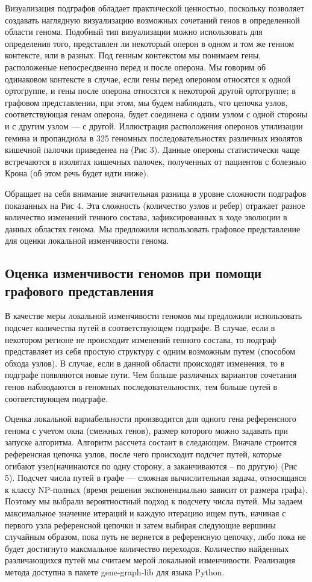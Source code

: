 Визуализация подграфов обладает практической ценностью, поскольку позволяет создавать наглядную визуализацию возможных сочетаний генов в определенной области генома. Подобный тип визуализации можно использовать для определения того, представлен ли некоторый оперон в одном и том же генном контексте, или в разных. Под генным контекстом мы понимаем гены, расположеные непосресдвенно перед и после оперона. Мы говорим об одинаковом контексте в случае, если гены перед опероном относятся к одной ортогруппе, и гены после оперона относятся к некоторой другой ортогруппе; в графовом представлении, при этом, мы будем наблюдать, что цепочка узлов, соответствующая генам оперона, будет соединена с одним узлом с одной стороны и с другим узлом --- с другой. Иллюстрация расположения оперонов утилизации гемина и пропандиола в 325 геномных последовательностях различных изолятов кишечной палочки приведенеа на (Рис 3). Данные опероны статистически чаще встречаются в изолятах кишечных палочек, полученных от пациентов с болезнью Крона (об этом речь будет идти ниже).

Обращает на себя внимание значительная разница в уровне сложности подграфов показанных на Рис 4. Эта сложность (количество узлов и ребер) отражает разное количество изменений генного состава, зафиксированных в ходе эволюции в данных областях генома. Мы предложили использовать графовое представление для оценки локальной изменчивости генома. 

\subsection*{Оценка изменчивости геномов при помощи графового представления}
В качестве меры локальной изменчивости геномов мы предложили использовать подсчет количества путей в соответствующем подграфе. В случае, если в некотором регионе не происходит изменений генного состава, то подграф представляет из себя простую структуру с одним возможным путем (способом обхода узлов). В случае, если в данной области происходят изменения, то в подграфе появляются новые пути. Чем больше различных вариантов сочетания генов наблюдаются в геномных последовательностях, тем больше путей в соответствующем подграфе. 

Оценка локальной вариабельности производится для одного гена референсного генома с учетом окна (смежных генов), размер которого можно задавать при запуске алгоритма. Алгоритм рассчета состаит в следающем. Вначале строится референсная цепочка узлов, после чего происходит подсчет путей, которые огибают узел(начинаются по одну сторону, а заканчиваются -- по другую) (Рис 5). Подсчет числа путей в графе --- сложная вычислительная задача, относящаяся к классу NP-полных (время решения экспоненциально зависит от размера графа). Поэтому мы выбрали вероятностный подход к подсчету числа путей. Мы задаем максимальное значение итераций и каждую итерацию ищем путь, начиная с первого узла референсной цепочки и затем выбирая следующие вершины случайным образом, пока путь не вернется в референсную цепочку, либо пока не будет достигнуто максмальное количество переходов. Количество найденных различающихся путей мы считаем мерой локальной изменчивости. Реализация метода доступна в пакете gene-graph-lib для языка Python.

